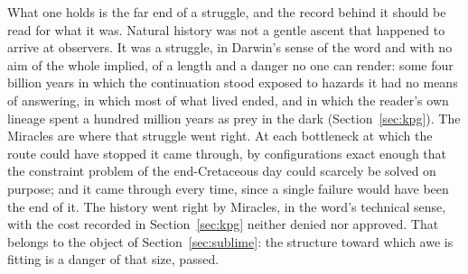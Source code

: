 What one holds is the far end of a struggle, and the record behind it
should be read for what it was. Natural history was not a gentle ascent
that happened to arrive at observers. It was a struggle, in Darwin's sense
of the word and with no aim of the whole implied, of a length and a danger
no one can render: some four billion years in which the continuation stood
exposed to hazards it had no means of answering, in which most of what
lived ended, and in which the reader's own lineage spent a hundred million
years as prey in the dark (Section~\ref{sec:kpg}). The Miracles are where
that struggle went right. At each bottleneck at which the route could have
stopped it came through, by configurations exact enough that the
constraint problem of the end-Cretaceous day could scarcely be solved on
purpose; and it came through every time, since a single failure would have
been the end of it. The history went right by Miracles, in the word's
technical sense, with the cost recorded in Section~\ref{sec:kpg} neither
denied nor approved. That belongs to the object of
Section~\ref{sec:sublime}: the structure toward which awe is fitting is a
danger of that size, passed.

